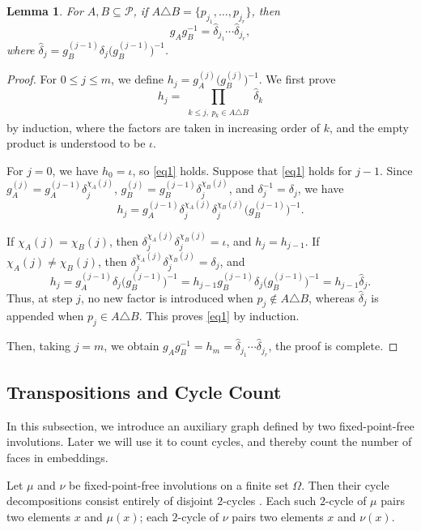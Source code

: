 \documentclass[12pt]{article}
\newtheorem{lemma}[theorem]{Lemma}
\theoremstyle{definition}
\begin{document}
\begin{lemma}
\label{lem2:8}
For $A,B\subseteq\mathcal P$,
if $A\triangle B=\{p_{j_1},\ldots,p_{j_r}\}$, then
$$g_Ag_B^{-1}
=
\widehat\delta_{j_1}\cdots\widehat\delta_{j_r},$$
where
$\widehat\delta_j
=g_B^{(j-1)}\delta_j\bigl(g_B^{(j-1)}\bigr)^{-1}$.
\end{lemma}
\begin{proof}
For $0\le j\le m$, we define
$h_j=g_A^{(j)}\bigl(g_B^{(j)}\bigr)^{-1}$.
We first prove
\begin{equation}
h_j=
\prod_{\substack{k\le j,\ p_k\in A\triangle B}}
\widehat\delta_k
\label{eq1}
\end{equation}
by induction, where the factors are taken in increasing order of $k$, and the empty product is understood to be $\iota$.

For $j=0$, we have $h_0=\iota$, so \eqref{eq1} holds. Suppose that \eqref{eq1} holds for $j-1$. Since
$g_A^{(j)}=g_A^{(j-1)}\delta_j^{\chi_A(j)}$,
$g_B^{(j)}=g_B^{(j-1)}\delta_j^{\chi_B(j)}$,
and $\delta_j^{-1}=\delta_j$, we have
$$h_j=g_A^{(j-1)}
\delta_j^{\chi_A(j)}
\delta_j^{\chi_B(j)}
\bigl(g_B^{(j-1)}\bigr)^{-1}.$$

If $\chi_A(j)=\chi_B(j)$, then
$\delta_j^{\chi_A(j)}\delta_j^{\chi_B(j)}=\iota$, and
$h_j=h_{j-1}$. If $\chi_A(j)\ne\chi_B(j)$, then
$\delta_j^{\chi_A(j)}\delta_j^{\chi_B(j)}=\delta_j$, and
$$
h_j
=
g_A^{(j-1)}\delta_j
\bigl(g_B^{(j-1)}\bigr)^{-1}
=
h_{j-1}
g_B^{(j-1)}\delta_j
\bigl(g_B^{(j-1)}\bigr)^{-1}
=
h_{j-1}\widehat\delta_j.
$$
Thus, at step $j$, no new factor is introduced when
$p_j\notin A\triangle B$, whereas $\widehat\delta_j$ is appended when
$p_j\in A\triangle B$. This proves \eqref{eq1} by induction.

Then, taking $j=m$, we obtain
$g_Ag_B^{-1}=h_m
=\widehat\delta_{j_1}\cdots\widehat\delta_{j_r}$, the proof is complete.
\end{proof}


\subsection{Transpositions and Cycle Count}
In this subsection, we introduce an auxiliary graph defined by two fixed-point-free involutions. Later we will use it to count cycles, and thereby count the number of faces in embeddings.

Let $\mu$ and $\nu$ be fixed-point-free involutions on a finite set
$\Omega$. Then their cycle decompositions consist entirely of disjoint $2$-cycles .
Each such $2$-cycle of $\mu$ pairs two elements $x$ and $\mu(x)$;
each $2$-cycle of $\nu$ pairs two elements $x$ and $\nu(x)$.
\end{document}
